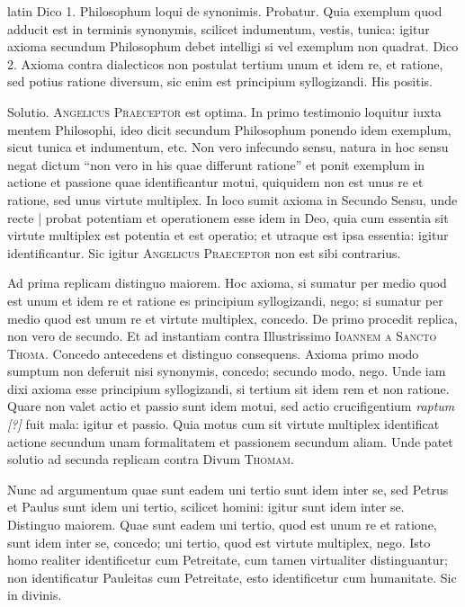 \begin{otherlanguage*}{latin}
\pstart
 Dico 1. Philosophum loqui de synonimis. Probatur. Quia exemplum quod adducit est in terminis synonymis, scilicet indumentum, vestis, tunica: igitur axioma secundum Philosophum debet intelligi si vel exemplum non quadrat. Dico 2. Axioma contra dialecticos non postulat tertium unum et idem re, et ratione, sed potius ratione diversum, sic enim est principium syllogizandi. His positis. 
\pend

\pstart
 Solutio. \textsc{Angelicus Praeceptor} est optima. In primo testimonio loquitur iuxta mentem Philosophi, ideo dicit secundum Philosophum ponendo idem exemplum, sicut tunica et indumentum, etc. Non vero infecundo sensu, natura in hoc sensu negat dictum \enquote{non vero in his quae differunt ratione} et ponit exemplum in actione et passione quae identificantur motui, quiquidem non est unus re et ratione, sed unus virtute multiplex. In loco  sumit axioma in Secundo Sensu, unde recte \textnormal{|}  probat potentiam et operationem esse idem in Deo, quia cum essentia sit virtute multiplex est potentia et est operatio; et utraque est ipsa essentia: igitur identificantur. Sic igitur \textsc{Angelicus Praeceptor} non est sibi contrarius. 
\pend

\pstart
 Ad prima replicam distinguo maiorem. Hoc axioma, si sumatur per medio quod est unum et idem re et ratione es principium syllogizandi, nego; si sumatur per medio quod est unum re et virtute multiplex, concedo. De primo procedit replica, non vero de secundo. Et ad instantiam contra Illustrissimo \textsc{Ioannem a Sancto Thoma}. Concedo antecedens et distinguo consequens. Axioma primo modo sumptum non deferuit nisi synonymis, concedo; secundo modo, nego. Unde iam dixi axioma esse principium syllogizandi, si tertium sit idem rem et non ratione. Quare non valet actio et passio sunt idem motui, sed actio crucifigentium \emph{raptum [?]} fuit mala: igitur et passio. Quia motus cum sit virtute multiplex identificat actione secundum unam formalitatem et passionem secundum aliam. Unde patet solutio ad secunda replicam contra Divum \textsc{Thomam}. 
\pend

\pstart
 Nunc ad argumentum quae sunt eadem uni tertio sunt idem inter se, sed Petrus et Paulus sunt idem uni tertio, scilicet homini: igitur sunt idem inter se. Distinguo maiorem. Quae sunt eadem uni tertio, quod est unum re et ratione, sunt idem inter se, concedo; uni tertio, quod est virtute multiplex, nego. Isto homo realiter identificetur cum Petreitate, cum tamen virtualiter distinguantur; non identificatur Pauleitas cum Petreitate, esto identificetur cum humanitate. Sic in divinis. 
\pend


\end{otherlanguage*}
